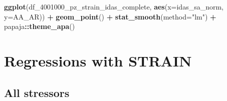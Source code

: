 \documentclass[
]{article}
\newenvironment{Shaded}{\begin{snugshade}}{\end{snugshade}}
\newcommand{\AttributeTok}[1]{\textcolor[rgb]{0.13,0.29,0.53}{#1}}
\newcommand{\FunctionTok}[1]{\textcolor[rgb]{0.13,0.29,0.53}{\textbf{#1}}}
\newcommand{\NormalTok}[1]{#1}
\newcommand{\SpecialCharTok}[1]{\textcolor[rgb]{0.81,0.36,0.00}{\textbf{#1}}}
\newcommand{\StringTok}[1]{\textcolor[rgb]{0.31,0.60,0.02}{#1}}
\begin{document}
\begin{Shaded}
\begin{Highlighting}[]
\FunctionTok{ggplot}\NormalTok{(df\_4001000\_pz\_strain\_idas\_complete, }\FunctionTok{aes}\NormalTok{(}\AttributeTok{x=}\NormalTok{idas\_sa\_norm, }\AttributeTok{y=}\NormalTok{AA\_AR)) }\SpecialCharTok{+}
  \FunctionTok{geom\_point}\NormalTok{() }\SpecialCharTok{+}
  \FunctionTok{stat\_smooth}\NormalTok{(}\AttributeTok{method=}\StringTok{"lm"}\NormalTok{) }\SpecialCharTok{+}
\NormalTok{    papaja}\SpecialCharTok{::}\FunctionTok{theme\_apa}\NormalTok{()}
\end{Highlighting}
\end{Shaded}

\hypertarget{regressions-with-strain}{%
\section{Regressions with STRAIN}\label{regressions-with-strain}}

\hypertarget{all-stressors}{%
\subsection{All stressors}\label{all-stressors}}
\end{document}
